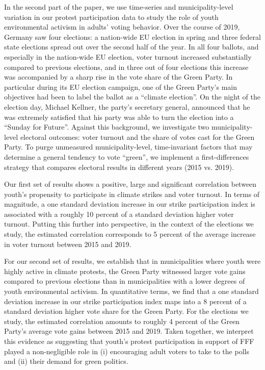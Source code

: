 In the second part of the paper, we use time-series and municipality-level variation in our protest participation data to study the role of youth environmental activism in adults' voting behavior. Over the course of 2019, Germany saw four elections: a nation-wide EU election in spring and three federal state elections spread out over the second half of the year. In all four ballots, and especially in the nation-wide EU election, voter turnout increased substantially compared to previous elections, and in three out of four elections this increase was accompanied by a sharp rise in the vote share of the Green Party. In particular during its EU election campaign, one of the Green Party's main objectives had been to label the ballot as a ``climate election''. On the night of the election day, Michael Kellner, the party's secretary general, announced that he was extremely satisfied that his party was able to turn the election into a ``Sunday for Future''. Against this background, we investigate two municipality-level electoral outcomes: voter turnout and the share of votes cast for the Green Party. To purge unmeasured municipality-level, time-invariant factors that may determine a general tendency to vote ``green'', we implement a first-differences strategy that compares electoral results in different years (2015 vs. 2019). %

Our first set of results shows a positive, large and significant correlation between youth's propensity to participate in climate strikes and voter turnout. In terms of magnitude, a one standard deviation increase in our strike participation index is associated with a roughly 10 percent of a standard deviation higher voter turnout. Putting this further into perspective, in the context of the elections we study, the estimated correlation corresponds to 5 percent of the average increase in voter turnout between 2015 and 2019. 

For our second set of results, we establish that in municipalities where youth were highly active in climate protests, the Green Party witnessed larger vote gains compared to previous elections than in municipalities with a lower degrees of youth environmental activism. In quantitative terms, we find that a one standard deviation increase in our strike participation index maps into a 8 percent of a standard deviation higher vote share for the Green Party. For the elections we study, the estimated correlation amounts to roughly 4 percent of the Green Party's average vote gains between 2015 and 2019. Taken together, we interpret this evidence as suggesting that youth's protest participation in support of FFF played a non-negligible role in  (i) encouraging adult voters to take to the polls and (ii) their demand for green politics. 

